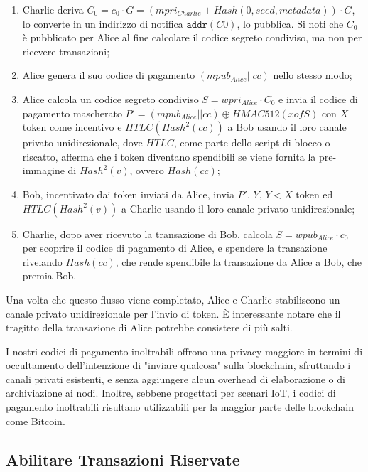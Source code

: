\begin{enumerate}
	\item Charlie deriva $C_0 = c_0\cdot G = (mpri_{Charlie} + Hash(0, seed, metadata))\cdot G$, lo converte in un indirizzo di notifica $\texttt{addr}(C0)$, lo pubblica. Si noti che $C_0$ è pubblicato per Alice al fine calcolare il codice segreto condiviso, ma non per ricevere     transazioni;

	\item Alice genera il suo codice di pagamento $(mpub_{Alice}||cc)$ nello stesso modo;

	\item Alice calcola un codice segreto condiviso $S = wpri_{Alice}\cdot C_0$ e invia il codice di pagamento mascherato $P' = (mpub_{Alice}||cc) \oplus HMAC512(xofS)$ con $X$ token come incentivo e $HTLC(Hash^2(cc))$ a Bob usando il loro canale privato unidirezionale, dove $HTLC$, come parte dello script di blocco o riscatto, afferma che i token diventano
	      spendibili se viene fornita la pre-immagine di $Hash^2(v)$, ovvero $Hash (cc)$;

	\item Bob, incentivato dai token inviati da Alice, invia $P'$, $Y$, $Y < X$ token ed $HTLC(Hash^2(v))$ a Charlie usando il loro canale privato unidirezionale;

	\item Charlie, dopo aver ricevuto la transazione di Bob, calcola $S = wpub_{Alice}\cdot c_0$ per scoprire il codice di pagamento di Alice, e spendere la transazione rivelando $Hash(cc)$, che rende spendibile la transazione da Alice a Bob, che premia Bob.
\end{enumerate}

Una volta che questo flusso viene completato, Alice e Charlie stabiliscono un canale privato unidirezionale per l'invio di token. È interessante notare che il tragitto della transazione di Alice potrebbe consistere di più salti.

I nostri codici di pagamento inoltrabili offrono una privacy maggiore in termini di occultamento dell'intenzione di "inviare qualcosa" sulla blockchain, sfruttando i canali privati esistenti, e senza aggiungere alcun overhead di elaborazione o di archiviazione ai nodi. Inoltre, sebbene progettati per scenari IoT, i codici di pagamento inoltrabili risultano utilizzabili per la maggior parte delle blockchain come Bitcoin.

\subsection{Abilitare Transazioni Riservate}

